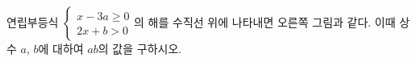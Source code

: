 \noindent\begin{minipage}[t]{0.58\linewidth}\vspace{0pt}\raggedright 연립부등식 $\begin{cases} x-3a\ge 0 \\ 2x+b>0 \end{cases}$의 해를 수직선 위에 나타내면 오른쪽 그림과 같다. 이때 상수 $a$, $b$에 대하여 $ab$의 값을 구하시오.\end{minipage}\hfill\begin{minipage}[t]{0.4\linewidth}\vspace{0pt}\centering \resizebox{\ifdim\width>\linewidth\linewidth\else\width\fi}{!}{}\end{minipage}\par
